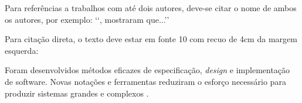 Para referências a trabalhos com até dois autores, deve-se citar o nome de 
ambos os autores, por exemplo: \lq\lq, mostraram 
que...\rq\rq

Para citação direta, o texto deve estar em fonte 10 com recuo de 4cm da margem esquerda:

\begin{citacao}
Foram desenvolvidos métodos eficazes de especificação, \textit{design} e implementação de software.  Novas notações e ferramentas reduziram o esforço necessário para produzir sistemas grandes e complexos .
\end{citacao}

